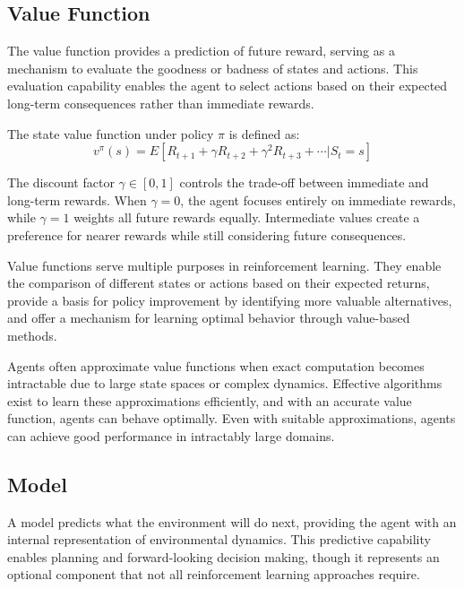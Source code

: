 \subsection{Value Function}

    The value function provides a prediction of future reward, serving as a mechanism to evaluate the goodness or badness of states and actions. This evaluation capability enables the agent to select actions based on their expected long-term consequences rather than immediate rewards.
    
    The state value function under policy $\pi$ is defined as:
    \begin{equation}
    v^\pi(s) = E[R_{t+1} + \gamma R_{t+2} + \gamma^2 R_{t+3} + \cdots | S_t = s]
    \end{equation}
    
    The discount factor $\gamma \in [0,1]$ controls the trade-off between immediate and long-term rewards. When $\gamma = 0$, the agent focuses entirely on immediate rewards, while $\gamma = 1$ weights all future rewards equally. Intermediate values create a preference for nearer rewards while still considering future consequences.
    
    Value functions serve multiple purposes in reinforcement learning. They enable the comparison of different states or actions based on their expected returns, provide a basis for policy improvement by identifying more valuable alternatives, and offer a mechanism for learning optimal behavior through value-based methods.
    
    Agents often approximate value functions when exact computation becomes intractable due to large state spaces or complex dynamics. Effective algorithms exist to learn these approximations efficiently, and with an accurate value function, agents can behave optimally. Even with suitable approximations, agents can achieve good performance in intractably large domains.


\subsection{Model}

    A model predicts what the environment will do next, providing the agent with an internal representation of environmental dynamics. This predictive capability enables planning and forward-looking decision making, though it represents an optional component that not all reinforcement learning approaches require.
    
